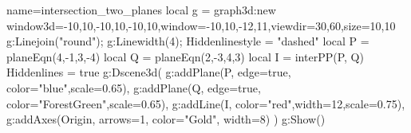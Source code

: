 \documentclass[12pt]{standalone}
\begin{document}
\begin{luadraw}{name=intersection_two_planes}
local g = graph3d:new{ window3d={-10,10,-10,10,-10,10},window={-10,10,-12,11},viewdir={30,60},size={10,10}}
g:Linejoin("round"); g:Linewidth(4); Hiddenlinestyle = "dashed"
local P = planeEqn(4,-1,3,-4)
local Q = planeEqn(2,-3,4,3) 
local I = interPP(P, Q) 
Hiddenlines = true
g:Dscene3d(
    g:addPlane(P, {edge=true, color="blue",scale=0.65}),
    g:addPlane(Q, {edge=true, color="ForestGreen",scale=0.65}), 
    g:addLine(I, {color="red",width=12,scale=0.75}),
    g:addAxes(Origin, {arrows=1, color="Gold", width=8})
    )
g:Show()
\end{luadraw} 
\end{document}
